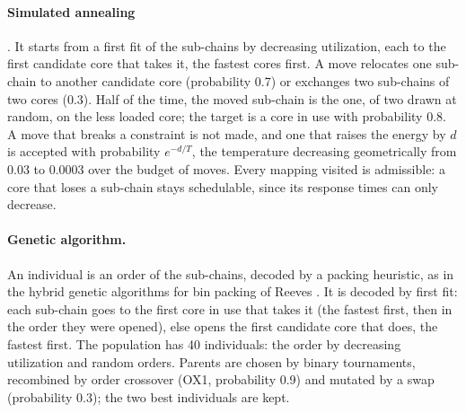 \paragraph{Simulated annealing} \cite{kirkpatrick1983optimization}. It
starts from a first fit of the sub-chains by decreasing utilization, each
to the first candidate core that takes it, the fastest cores first. A move
relocates one sub-chain to another candidate core (probability 0.7) or
exchanges two sub-chains of two cores (0.3). Half of the time, the moved
sub-chain is the one, of two drawn at random, on the less loaded core; the
target is a core in use with probability 0.8. A move that breaks a
constraint is not made, and one that raises the energy by $d$ is accepted
with probability $e^{-d/T}$, the temperature decreasing geometrically
from 0.03 to 0.0003 over the budget of moves. Every mapping visited is
admissible: a core that loses a sub-chain stays schedulable, since its
response times can only decrease.

\paragraph{Genetic algorithm.} An individual is an order of the
sub-chains, decoded by a packing heuristic, as in the hybrid genetic algorithms for
bin packing of Reeves \cite{reeves1996hybrid}. It is decoded by first fit: each sub-chain
goes to the first core in use that takes it (the fastest first, then in
the order they were opened), else opens the first candidate core that
does, the fastest first. The population has 40 individuals: the order by
decreasing utilization and random orders. Parents are chosen by binary
tournaments, recombined by order crossover (OX1, probability 0.9) and
mutated by a swap (probability 0.3); the two best individuals are kept.

